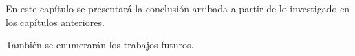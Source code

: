 En este capítulo se presentará la conclusión arribada a partir de lo investigado en los capítulos anteriores.

También se enumerarán los trabajos futuros.